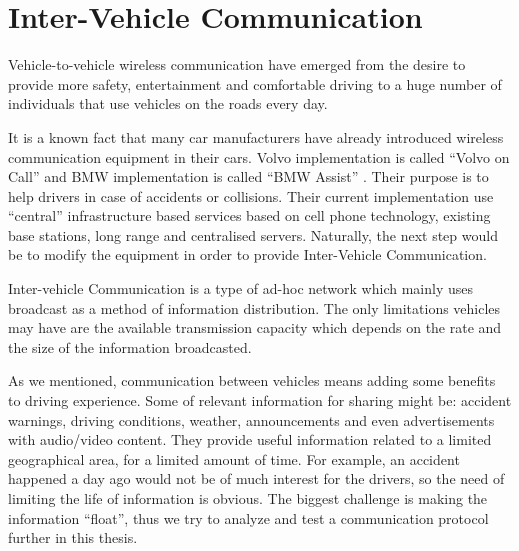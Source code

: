\section{Inter-Vehicle Communication}

Vehicle-to-vehicle wireless communication have emerged from the desire to
provide more safety, entertainment and comfortable driving to a huge number of
individuals that use vehicles on the roads every day.

It is a known fact that many car manufacturers have already introduced wireless
communication equipment in their cars. Volvo implementation is called ``Volvo on
Call'' \citep{volvo} and BMW implementation is called ``BMW Assist''
\cite{bmw_assist}. Their purpose is to help drivers in case of accidents or
collisions. Their current implementation use ``central'' infrastructure based
services based on cell phone technology, existing base stations, long range and
centralised servers. Naturally, the next step would be to modify the equipment
in order to provide Inter-Vehicle Communication.

Inter-vehicle Communication is a type of ad-hoc network which mainly uses
broadcast as a method of information distribution. The only limitations vehicles
may have are the available transmission capacity which depends on the rate and
the size of the information broadcasted.

As we mentioned, communication between vehicles means adding some benefits to
driving experience. Some of relevant information for sharing might be: accident
warnings, driving conditions, weather, announcements and even advertisements
with audio/video content. They provide useful information related to a limited
geographical area, for a limited amount of time. For example, an accident
happened a day ago would not be of much interest for the drivers, so the need of
limiting the life of information is obvious. The biggest challenge is making
the information ``float'', thus we try to analyze and test a communication
protocol further in this thesis.

